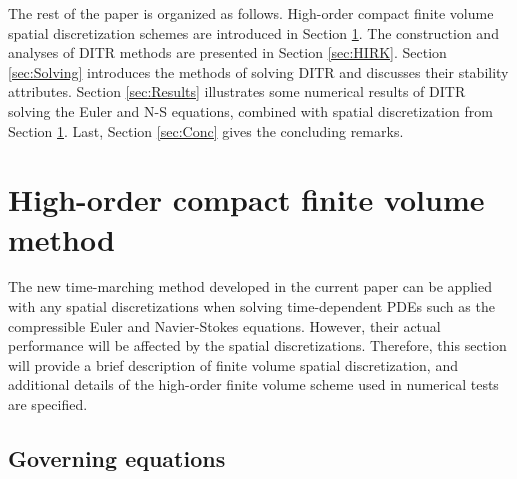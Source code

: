 
The rest of the paper is organized as follows.
High-order compact finite volume spatial  discretization schemes
are introduced in Section \ref{sec:CFV}.
The construction and analyses of DITR methods are presented
in Section \ref{sec:HIRK}.
Section \ref{sec:Solving} introduces the methods
of solving DITR and discusses their stability attributes.
Section \ref{sec:Results} illustrates some numerical results of
DITR solving the Euler and N-S equations, combined with
spatial  discretization from Section \ref{sec:CFV}.
Last, Section \ref{sec:Conc} gives the concluding remarks.


\section{High-order compact finite volume method}
\label{sec:CFV}



The new time-marching method developed in
the current paper can be applied with
any spatial discretizations when solving
time-dependent PDEs such as the compressible Euler and Navier-Stokes
equations.
However, their actual performance will be affected by
the spatial discretizations.
Therefore,
this section will provide a brief description of
finite volume spatial  discretization,
and additional details
of the high-order finite volume scheme
used in numerical tests are specified.

\subsection{Governing equations}
\label{ssec:GovEq}

